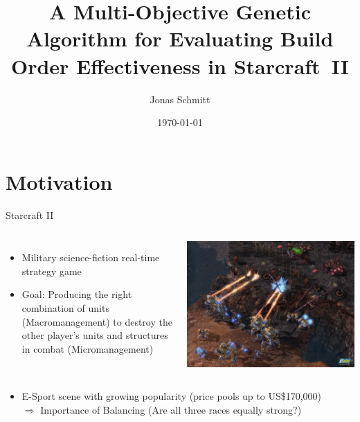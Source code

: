 \documentclass{beamer}
\title{A Multi-Objective Genetic Algorithm for Evaluating Build Order Effectiveness in Starcraft~II} %
\author{Jonas Schmitt} %
\date{\today} %
\begin{document}
\begin{frame}
\titlepage %
\end{frame}

\section{Motivation}
\begin{frame}{Starcraft II}
\begin{columns}[c] %
    \begin{itemize}
		\item Military science-fiction real-time strategy game
		\item \alert{Goal:} Producing the right combination of units (\alert{Macromanagement}) to destroy the other player's units and structures in combat (\alert{Micromanagement})
	\end{itemize}
    	\includegraphics[width=1.0\linewidth]{starcraft-2-screenshot.jpg}
\end{columns}
\begin{itemize}
\item E-Sport scene with growing popularity (price pools up to US\$170,000)
\\ $\Rightarrow$ Importance of \alert{Balancing} (Are all three races equally strong?) 
\end{itemize}
\end{frame}
\end{document}
